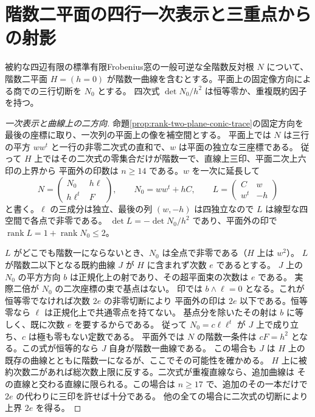 \section{階数二平面の四行一次表示と三重点からの射影}
\label{sec:rank-two-plane-bordered-quartic}
\begin{theorem}\label{thm:rank-two-plane-bordered-quartic}
被約な四辺有限の標準有限Frobenius窓の一般可逆な全階数反対根 $N$ について、
階数二平面 $H=(h=0)$ が階数一曲線を含むとする。平面上の固定像方向による商での三行切断を $N_0$ とする。
四次式 $\det N_0/h^2$ は恒等零か、重複既約因子を持つ。
\end{theorem}
\begin{proof}[一次表示と曲線上の二方向]
命題\ref{prop:rank-two-plane-conic-trace}の固定方向を最後の座標に取り、一次列の平面上の像を補空間とする。
平面上では $N$ は三行の平方 $ww^t$ と一行の非零二次式の直和で、$w$ は平面の独立な三座標である。
従って $H$ 上ではその二次式の零集合だけが階数一で、直線上三印、平面二次上六印の上界から
平面外の印数は $n\ge14$ である。$w$ を一次に延長して
\[
 N=\begin{pmatrix}N_0&h\ell\\ h\ell^t&F\end{pmatrix},
 \qquad N_0=ww^t+hC,\qquad
 L=\begin{pmatrix}C&w\\ w^t&-h\end{pmatrix}
\]
と書く。$\ell$ の三成分は独立、最後の列 $(w,-h)$ は四独立なので $L$ は線型な四空間で各点で非零である。
$\det L=-\det N_0/h^2$ であり、平面外の印で $\operatorname{rank} L=1+\operatorname{rank}N_0\le2$。

$L$ がどこでも階数一にならないとき、$N_0$ は全点で非零である（$H$ 上は $w^2$）。
$L$ が階数二以下となる既約曲線 $J$ が $H$ に含まれず次数 $e$ であるとする。
$J$ 上の $N_0$ の平方方向 $b$ は正規化上の射であり、その超平面束の次数は $e$ である。
実際二倍が $N_0$ の二次座標の束で基点はない。
印では $b\wedge\ell=0$ となる。これが恒等零でなければ次数 $2e$ の非零切断により
平面外の印は $2e$ 以下である。恒等零なら $\ell$ は正規化上で共通零点を持てない。
基点分を除いたその射は $b$ に等しく、既に次数 $e$ を要するからである。
従って $N_0=c\ell\ell^t$ が $J$ 上で成り立ち、$c$ は極も零もない定数である。
平面外では $N$ の階数一条件は $cF=h^2$ となる。この式が恒等的なら $J$ 自身が階数一曲線である。
この場合も $J$ は $H$ 上の既存の曲線とともに階数一になるが、ここでその可能性を確かめる。
$H$ 上に被約次数二があれば総次数上限に反する。二次式が重複直線なら、追加曲線は
その直線と交わる直線に限られる。この場合は $n\ge17$ で、追加のその一本だけで
$2e$ の代わりに三印を許せば十分である。
他の全ての場合に二次式の切断により上界 $2e$ を得る。
\end{proof}
